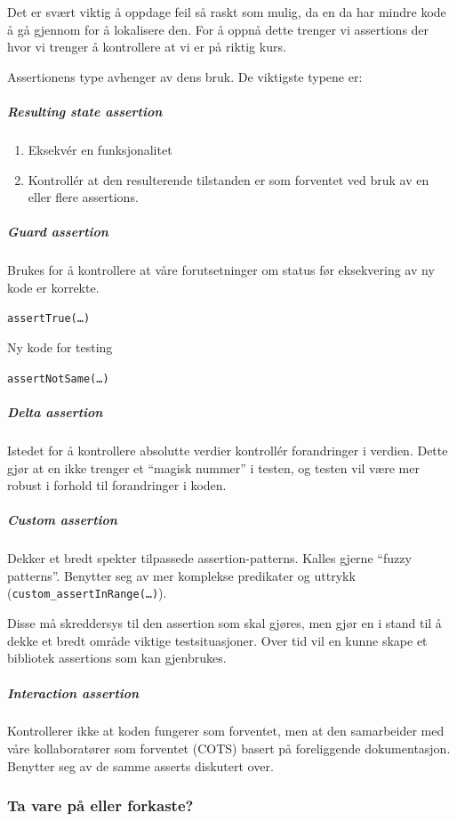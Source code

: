 Det er svært viktig å oppdage feil så raskt som mulig, da en da har
mindre kode å gå gjennom for å lokalisere den. For å oppnå dette trenger
vi assertions der hvor vi trenger å kontrollere at vi er på riktig kurs.

Assertionens type avhenger av dens bruk. De viktigste typene er:

\subparagraph{Resulting state assertion}

\begin{enumerate}[1.]
\item
  Eksekvér en funksjonalitet
\item
  Kontrollér at den resulterende tilstanden er som forventet ved bruk av
  en eller flere assertions.
\end{enumerate}
\subparagraph{Guard assertion}

Brukes for å kontrollere at våre forutsetninger om status før
eksekvering av ny kode er korrekte.

\texttt{assertTrue(\ldots{})}

Ny kode for testing

\texttt{assertNotSame(\ldots{})}

\subparagraph{Delta assertion}

Istedet for å kontrollere absolutte verdier kontrollér forandringer i
verdien. Dette gjør at en ikke trenger et ``magisk nummer'' i testen, og
testen vil være mer robust i forhold til forandringer i koden.

\subparagraph{Custom assertion}

Dekker et bredt spekter tilpassede assertion-patterns. Kalles gjerne
``fuzzy patterns''. Benytter seg av mer komplekse predikater og uttrykk
(\texttt{custom\_assertInRange(\ldots{})}).

Disse må skreddersys til den assertion som skal gjøres, men gjør en i
stand til å dekke et bredt område viktige testsituasjoner. Over tid vil
en kunne skape et bibliotek assertions som kan gjenbrukes.

\subparagraph{Interaction assertion}

Kontrollerer ikke at koden fungerer som forventet, men at den
samarbeider med våre kollaboratører som forventet (COTS) basert på
foreliggende dokumentasjon. Benytter seg av de samme asserts diskutert
over.

\subsubsection{Ta vare på eller forkaste?}

